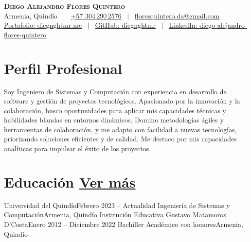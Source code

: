 \documentclass[letterpaper,12pt]{fed-res} %
\begin{document}
\begin{center}
    \textbf{\Huge \scshape Diego Alejandro Flores Quintero} \\ \vspace{1pt}
    Armenia, Quindío \ $|$ \
    \href{http://wa.me/+573042902576}{+57 304\,290\,2576} \ $|$ \
    \href{mailto:floresquintero.da@gmail.com}{floresquintero.da@gmail.com} \\[1pt]
    \href{https://www.diegnghtmr.me}{Portafolio: diegnghtmr.me} \ $|$ \
    \href{https://github.com/diegnghtmr}{GitHub: diegnghtmr} \ $|$ \
    \href{https://www.linkedin.com/in/diego-alejandro-flores-quintero/}{LinkedIn: diego-alejandro-flores-quintero}
\end{center}


\section{Perfil Profesional}
Soy Ingeniero de Sistemas y Computación con experiencia en desarrollo de software y gestión de proyectos tecnológicos. Apasionado por la innovación y la colaboración, busco oportunidades para aplicar mis capacidades técnicas y habilidades blandas en entornos dinámicos. Domino metodologías ágiles y herramientas de colaboración, y me adapto con facilidad a nuevas tecnologías, priorizando soluciones eficientes y de calidad. Me destaco por mis capacidades analíticas para impulsar el éxito de los proyectos.

\section{Educación \hfill \href{https://drive.google.com/file/d/1cras1sFMm4xzjevj74aj3FlKdpZc1EBP/view?usp=sharing}{Ver más}}
    \resumeSubHeadingListStart
        \resumeSubheading
            {Universidad del Quindío}{Febrero 2023 -- Actualidad}
            {Ingeniería de Sistemas y Computación}{Armenia, Quindío}
        \resumeSubheading
            {Institución Educativa Gustavo Matamoros D'Costa}{Enero 2012 -- Diciembre 2022}
            {Bachiller Académico con honores}{Armenia, Quindío}
    \resumeSubHeadingListEnd
\end{document}
